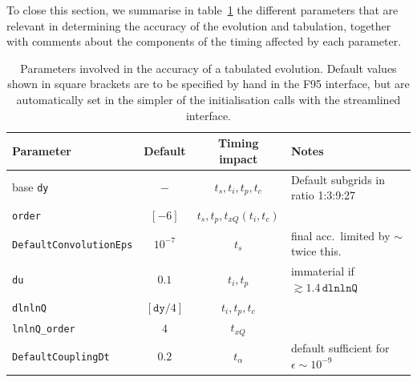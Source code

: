 \documentclass[12pt]{article}
\newcommand{\comment}[1]{\textbf{[#1]}}
\newcommand{\ttt}[1]{\texttt{#1}}
\begin{document}
To close this section, we summarise in table~\ref{tab:acc-param} the
different parameters that are relevant in determining the accuracy of
the evolution and tabulation, together with comments about the
components of the timing affected by each parameter.


\begin{table}
  \centering
  \begin{tabular}{|l|c|c|l|} \hline
    Parameter & Default & Timing impact & Notes \\ \hline
    base \ttt{dy}  &  $-$    &   $t_s, t_i, t_p, t_c$    & Default subgrids
    in ratio 1:3:9:27 \\
    \ttt{order} &  $[-6]$    &   $t_s, t_p, t_{xQ} (t_i, t_c)$ & \\ 
    \ttt{DefaultConvolutionEps} & $10^{-7}$ & $t_s$ & final acc.\
    limited by $\sim$ twice this.\\ \hline
    \ttt{du}  &  $0.1$ &  $t_i, t_p$ & immaterial if $\gtrsim 1.4\,
    \ttt{dlnlnQ}$\\
    \ttt{dlnlnQ}       &  $[\ttt{dy}/4] $ &  $t_i, t_p, t_c$ &  \\
    \ttt{lnlnQ\_order} &  $4$ &  $t_{xQ}$ &  \\ \hline
    \ttt{DefaultCouplingDt} & $0.2$ & $t_\alpha$ & default sufficient for 
$\epsilon \sim 10^{-9}$\\
    \hline
  \end{tabular}
  \caption{Parameters involved in the accuracy
of a tabulated evolution. Default values shown in square
    brackets are to be specified by hand in the F95 interface, but are
    automatically set in the simpler of the initialisation calls with
    the streamlined interface.} 
  \label{tab:acc-param}
\end{table}
\end{document}
